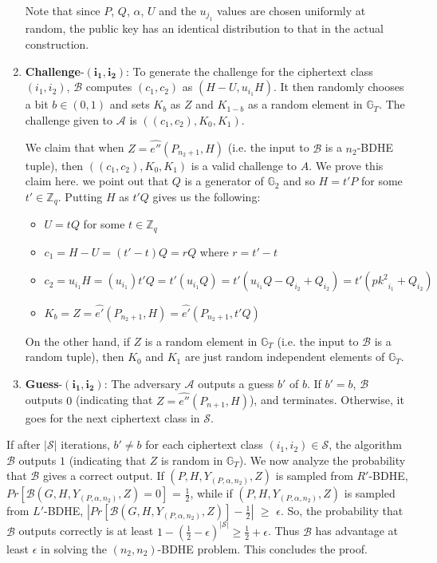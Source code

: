 \begin{enumerate}
 Note that since $P$, $Q$, $\alpha$, $U$ and the $u_{j_1}$ values are chosen uniformly at random, the public key has an identical distribution to that in the actual construction.
 
 \item \textbf{Challenge}-$\mathbf{(i_1,i_2)}$: To generate the challenge for the ciphertext class $(i_1,i_2)$, $\mathcal{B}$ computes $(c_1,c_2)$ as $(H-U,u_{i_1}H)$. It then randomly chooses a bit $b\in{(0,1)}$ and sets $K_b$ as $Z$ and $K_{1-b}$ as a random element in $\mathbb{G}_T$. The challenge given to $\mathcal{A}$ is $((c_1,c_2),K_0,K_1)$. 
 
 We claim that when $Z=\hat{e''}(P_{n_2+1},H)$ (i.e. the input to $\mathcal{B}$ is a $n_2$-BDHE tuple), then $((c_1,c_2),K_0,K_1)$ is a valid challenge to $A$. We prove this claim here. we point out that $Q$ is a generator of $\mathbb{G}_2$ and so $H=t'P$ for some $t'\in\mathbb{Z}_q$. Putting $H$ as $t'Q$ gives us the following:
 \begin{itemize}
  \item  $U=tQ$ for some $t\in\mathbb{Z}_q$
  \item $c_1=H-U=(t'-t)Q=rQ$ where $r=t'-t$
  \item $c_2=u_{i_1}H=(u_{i_1})t'Q=t'(u_{i_1}Q)=t'(u_{i_1}Q-Q_{i_2}+Q_{i_2})=t'({pk^2}_{i_1}+Q_{i_2})$
  \item $K_b=Z=\hat{e'}(P_{n_2+1},H)=\hat{e'}(P_{n_2+1},t'Q)$
 \end{itemize}
 On the other hand, if $Z$ is a random element in $\mathbb{G}_T$ (i.e. the input to $\mathcal{B}$ is a random tuple), then $K_0$ and $K_1$ are just random independent elements of $\mathbb{G}_T$.
 
 \item\textbf{Guess}-$\mathbf{(i_1,i_2)}$: The adversary $\mathcal{A}$ outputs a guess $b'$ of $b$. If $b' = b$, $\mathcal{B}$ outputs $0$ (indicating that $Z = \hat{e''}(P_{n+1},H)$), and terminates. Otherwise, it goes for the next ciphertext class in $\mathcal{S}$.
\end{enumerate}
If after $|\mathcal{S}|$ iterations, $b' \neq b$ for each ciphertext class $(i_1,i_2)\in\mathcal{S}$, the algorithm $\mathcal{B}$ outputs $1$ (indicating that $Z$ is random in $\mathbb{G}_T$). We now analyze the probability that $\mathcal{B}$ gives a correct output. If $(P,H,Y_{(P,\alpha,n_2)},Z)$ is sampled from $R'$-BDHE, $Pr[\mathcal{B}(G,H,Y_{(P,\alpha,n_2)},Z)=0]$ = $\frac{1}{2}$, while if $(P,H,Y_{(P,\alpha,n_2)},Z)$ is sampled from $L'$-BDHE, $|Pr[\mathcal{B}(G,H,Y_{(P,\alpha,n_2)},Z)]-\frac{1}{2}|$ $\geq$ $\epsilon$. So, the probability that $\mathcal{B}$ outputs correctly is at least $1-(\frac{1}{2}-\epsilon)^{|\mathcal{S}|} \geq \frac{1}{2}+\epsilon$. Thus $\mathcal{B}$ has advantage at least $\epsilon$ in solving the $(n_2,n_2)$-BDHE problem. This concludes the proof.
